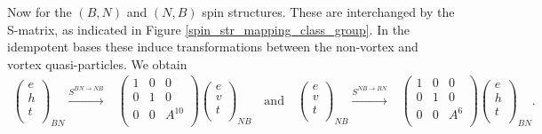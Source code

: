 \documentclass[12pt,a4paper]{article}
\newcounter{arrow}
\begin{document}
Now for the $(B,N)$ and $(N,B)$ spin structures.
These are interchanged by the S-matrix, as indicated in Figure \ref{spin_str_mapping_class_group}.
In the idempotent bases these induce transformations between the non-vortex and vortex quasi-particles.
We obtain 
\begin{align}
\left( \begin{matrix}
e\\
h\\
t\\
\end{matrix} \right)_{BN} 
\xrightarrow{S^{BN \rightarrow NB}} & \left( \begin{matrix}
1&0&0\\
0&1&0\\
0&0&A^{10}\\
\end{matrix} \right)
\left( \begin{matrix}
e\\
v\\
t\\
\end{matrix} \right)_{NB}
\quad \text{and} \quad 
\left( \begin{matrix}
e\\
v\\
t\\
\end{matrix} \right)_{NB} 
\xrightarrow{S^{NB \rightarrow BN}} & \left( \begin{matrix}
1&0&0\\
0&1&0\\
0&0&A^{6}\\
\end{matrix} \right)
\left( \begin{matrix}
e\\
h\\
t\\
\end{matrix} \right)_{BN}.
\end{align}
\end{document}
